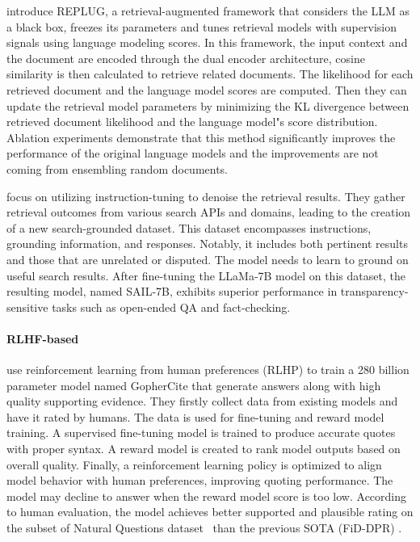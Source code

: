 \citet{REPLUG} introduce REPLUG, a retrieval-augmented framework that considers the LLM as a black box, freezes its parameters and tunes retrieval models with supervision signals using language modeling scores. In this framework, the input context and the document are encoded through the dual encoder architecture,  cosine similarity is then calculated to retrieve related documents. The likelihood for each retrieved document and the language model scores are computed. Then they can update the retrieval model parameters by minimizing the KL divergence between retrieved document likelihood and the language model"s score distribution.  Ablation experiments demonstrate that this method significantly improves the performance of the original language models and the improvements are not coming from ensembling random documents.

\citet{luo2023sail} focus on utilizing instruction-tuning to denoise the retrieval results. They gather retrieval outcomes from various search APIs and domains, leading to the creation of a new search-grounded dataset. This dataset encompasses instructions, grounding information, and responses. Notably, it includes both pertinent results and those that are unrelated or disputed. The model needs to learn to ground on useful search results. After fine-tuning the LLaMa-7B model on this dataset, the resulting model, named SAIL-7B, exhibits superior performance in transparency-sensitive tasks such as open-ended QA and fact-checking.


\paragraph{\textbf{RLHF-based}}
\citet{GopherCite} use reinforcement learning from human preferences (RLHP) to train a 280 billion parameter model named GopherCite that generate answers along with high quality supporting evidence. They firstly collect data from existing models and have it rated by humans. The data is used for fine-tuning and reward model training. A supervised fine-tuning model is trained to produce accurate quotes with proper syntax. A reward model is created to rank model outputs based on overall quality. Finally, a reinforcement learning policy is optimized to align model behavior with human preferences, improving quoting performance. The model may decline to answer when the reward model score is too low. According to human evaluation, the model achieves better supported and plausible rating on the subset of Natural Questions dataset~\citep{NQ} than the previous SOTA (FiD-DPR) \citep{Fusion-in-Decoder}.


